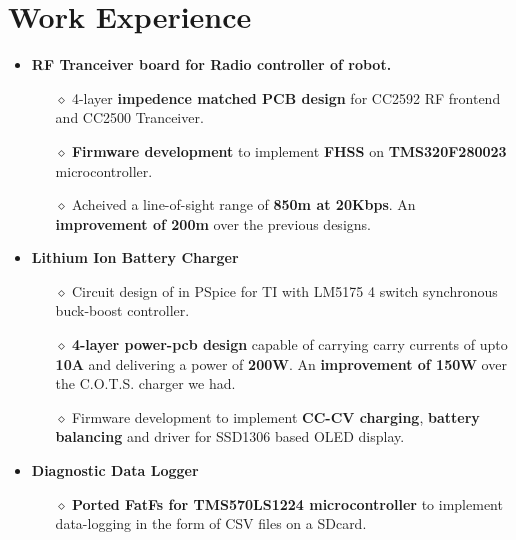 \documentclass{resume}
\begin{document}
\section{Work Experience}
\vspace{0cm}
\begin{itemize}\setlength{\itemsep}{1pt}\setlength{\parskip}{0pt}\vspace{0cm}
    \item \textbf{RF Tranceiver board for Radio controller of robot.}
    \begin{itemize}\setlength{\itemsep}{3pt}\setlength{\parskip}{0pt}
        \item[$\diamond$] 4-layer \textbf{impedence matched PCB design} for CC2592 RF frontend and CC2500 Tranceiver.
        \item[$\diamond$] \textbf{Firmware development} to implement \textbf{FHSS} on \textbf{TMS320F280023} microcontroller.
        \item[$\diamond$] Acheived a line-of-sight range of \textbf{850m at 20Kbps}. An \textbf{improvement of 200m} over the previous designs.
    \end{itemize}
    \vspace{0.3cm}
    \item \textbf{Lithium Ion Battery Charger}
    \begin{itemize}\setlength{\itemsep}{3pt}\setlength{\parskip}{0pt}
        \item[$\diamond$] Circuit design of in PSpice for TI with LM5175 4 switch synchronous buck-boost controller. 
        \item[$\diamond$] \textbf{4-layer power-pcb design} capable of carrying carry currents of upto \textbf{10A} and delivering a power of \textbf{200W}. An \textbf{improvement of 150W} over the C.O.T.S. charger we had.
        \item[$\diamond$] Firmware development to implement \textbf{CC-CV charging}, \textbf{battery balancing} and driver for SSD1306 based OLED display.
    \end{itemize}
    \vspace{0.3cm}
    \item \textbf{Diagnostic Data Logger}
    \begin{itemize}\setlength{\itemsep}{3pt}\setlength{\parskip}{0pt}
        \item[$\diamond$] \textbf{Ported FatFs for TMS570LS1224 microcontroller} to implement data-logging in the form of CSV files on a SDcard.
        \item[] 
    \end{itemize}
\end{itemize}
\end{document}
